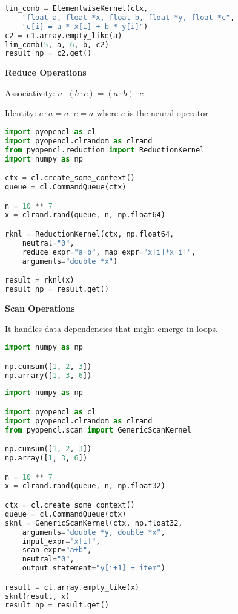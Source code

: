 \documentclass{article}
\begin{document}
\begin{lstlisting}[language=Python]
lin_comb = ElementwiseKernel(ctx,
    "float a, float *x, float b, float *y, float *c",
    "c[i] = a * x[i] + b * y[i]")
c2 = c1.array.empty_like(a)
lim_comb(5, a, 6, b, c2)
result_np = c2.get()
\end{lstlisting}

\textbf{Reduce Operations}

Associativity: $a \cdot (b \cdot c) = (a \cdot b) \cdot c$ 

Identity: $e\cdot a = a\cdot e = a$ where $e$ is the neural operator

\begin{lstlisting}[language=Python]
import pyopencl as cl
import pyopencl.clrandom as clrand
from pyopencl.reduction import ReductionKernel
import numpy as np

ctx = cl.create_some_context()
queue = cl.CommandQueue(ctx)

n = 10 ** 7
x = clrand.rand(queue, n, np.float64)

rknl = ReductionKernel(ctx, np.float64, 
    neutral="0",
    reduce_expr="a+b", map_expr="x[i]*x[i]",
    arguments="double *x")

result = rknl(x)
result_np = result.get()
\end{lstlisting}

\textbf{Scan Operations} 

It handles data dependencies that might emerge in loops.

\begin{lstlisting}[language=Python]
import numpy as np 

np.cumsum([1, 2, 3])
np.arrary([1, 3, 6])
\end{lstlisting}

\begin{lstlisting}[language=Python]
import numpy as np 

import pyopencl as cl
import pyopencl.clrandom as clrand
from pyopencl.scan import GenericScanKernel

np.cumsum([1, 2, 3])
np.array([1, 3, 6])

n = 10 ** 7
x = clrand.rand(queue, n, np.float32)

ctx = cl.create_some_context()
queue = cl.CommandQueue(ctx)
sknl = GenericScanKernel(ctx, np.float32, 
    arguments="double *y, double *x",
    input_expr="x[i]",
    scan_expr="a+b",
    neutral="0",
    output_statement="y[i+1] = item")

result = cl.array.empty_like(x)
sknl(result, x)
result_np = result.get()
\end{lstlisting}
\end{document}
